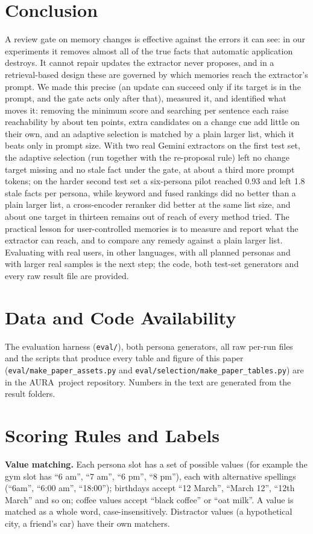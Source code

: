 \IfFileExists{IEEEtran.cls}{\documentclass[journal]{IEEEtran}\def\HAVEIEEE{1}}{\documentclass[10pt,twocolumn]{article}\usepackage[margin=0.7in,columnsep=0.25in]{geometry}}
\providecommand{\appendices}{\appendix}
\newcommand{\aura}{AURA}
\begin{document}
\section{Conclusion}
A review gate on memory changes is effective against the errors it can see: in our experiments it removes almost all of the true facts that automatic application destroys. It cannot repair updates the extractor never proposes, and in a retrieval-based design these are governed by which memories reach the extractor's prompt. We made this precise (an update can succeed only if its target is in the prompt, and the gate acts only after that), measured it, and identified what moves it: removing the minimum score and searching per sentence each raise reachability by about ten points, extra candidates on a change cue add little on their own, and an adaptive selection is matched by a plain larger list, which it beats only in prompt size. With two real Gemini extractors on the first test set, the adaptive selection (run together with the re-proposal rule) left no change target missing and no stale fact under the gate, at about a third more prompt tokens; on the harder second test set a six-persona pilot reached 0.93 and left 1.8 stale facts per persona, while keyword and fused rankings did no better than a plain larger list, a cross-encoder reranker did better at the same list size, and about one target in thirteen remains out of reach of every method tried. The practical lesson for user-controlled memories is to measure and report what the extractor can reach, and to compare any remedy against a plain larger list. Evaluating with real users, in other languages, with all planned personas and with larger real samples is the next step; the code, both test-set generators and every raw result file are provided.

\section*{Data and Code Availability}
The evaluation harness (\texttt{eval/}), both persona generators, all raw per-run files and the scripts that produce every table and figure of this paper (\texttt{eval/make\_paper\_assets.py} and \texttt{eval/selection/make\_paper\_tables.py}) are in the \aura\ project repository. Numbers in the text are generated from the result folders.

\appendices
\FloatBarrier
\section{Scoring Rules and Labels}
\label{app:scoring}
\textbf{Value matching.} Each persona slot has a set of possible values (for example the gym slot has ``6 am'', ``7 am'', ``6 pm'', ``8 pm''), each with alternative spellings (``6am'', ``6:00 am'', ``18:00''); birthdays accept ``12 March'', ``March 12'', ``12th March'' and so on; coffee values accept ``black coffee'' or ``oat milk''. A value is matched as a whole word, case-insensitively. Distractor values (a hypothetical city, a friend's car) have their own matchers.
\end{document}
